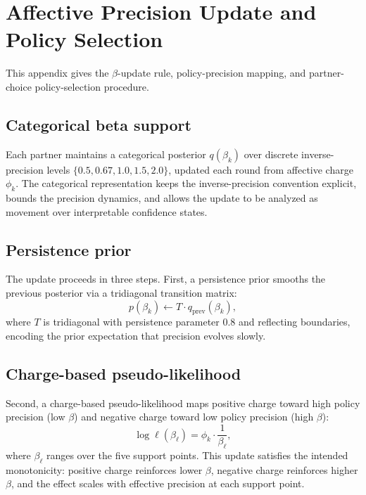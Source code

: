 \section{Affective Precision Update and Policy Selection}
\label{app:precision_update}

This appendix gives the $\beta$-update rule, policy-precision mapping, and partner-choice policy-selection procedure.

\subsection{Categorical beta support}

Each partner maintains a categorical posterior $q(\beta_k)$ over discrete inverse-precision levels $\{0.5, 0.67, 1.0, 1.5, 2.0\}$, updated each round from affective charge $\phi_k$. The categorical representation keeps the inverse-precision convention explicit, bounds the precision dynamics, and allows the update to be analyzed as movement over interpretable confidence states.

\subsection{Persistence prior}

The update proceeds in three steps. First, a persistence prior smooths the previous posterior via a tridiagonal transition matrix:
\begin{equation}
p(\beta_k) \leftarrow T \cdot q_{\text{prev}}(\beta_k),
\label{eq:persistence}
\end{equation}
where $T$ is tridiagonal with persistence parameter 0.8 and reflecting boundaries, encoding the prior expectation that precision evolves slowly.

\subsection{Charge-based pseudo-likelihood}

Second, a charge-based pseudo-likelihood maps positive charge toward high policy precision (low $\beta$) and negative charge toward low policy precision (high $\beta$):
\begin{equation}
\log \ell(\beta_\ell) = \phi_k \cdot \frac{1}{\beta_\ell},
\label{eq:pseudo_lik}
\end{equation}
where $\beta_\ell$ ranges over the five support points. This update satisfies the intended monotonicity: positive charge reinforces lower $\beta$, negative charge reinforces higher $\beta$, and the effect scales with effective precision at each support point.

